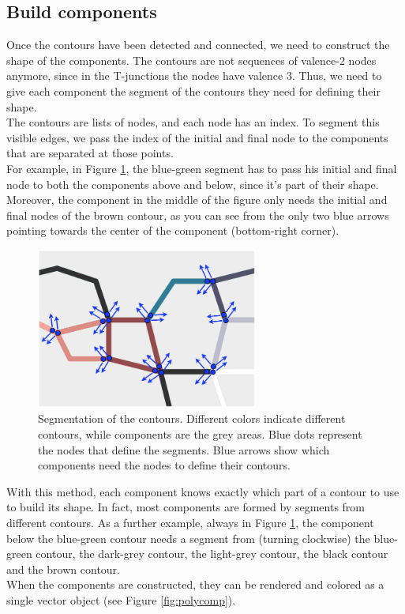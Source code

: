 \documentclass[]{usiinfbachelorproject}
\begin{document}

\subsection{Build components}

Once the contours have been detected and connected, we need to construct the shape of the components. The contours are not sequences of valence-2 nodes anymore, since in the T-junctions the nodes have valence 3. Thus, we need to give each component the segment of the contours they need for defining their shape.\\
The contours are lists of nodes, and each node has an index. To segment this visible edges, we pass the index of the initial and final node to the components that are separated at those points. \\
For example, in Figure \ref{fig:segment}, the blue-green segment has to pass his initial and final node to both the components above and below, since it's part of their shape. Moreover, the component in the middle of the figure only needs the initial and final nodes of the brown contour, as you can see from the only two blue arrows pointing towards the center of the component (bottom-right corner).

\begin{figure}[ht]
	\centering
	\includegraphics[width=0.65\textwidth]{img/segmentation.png}
	\caption{Segmentation of the contours. Different colors indicate different contours, while components are the grey areas. Blue dots represent the nodes that define the segments. Blue arrows show which components need the nodes to define their contours.}
	\label{fig:segment}
\end{figure}

\noindent With this method, each component knows exactly which part of a contour to use to build its shape. In fact, most components are formed by segments from different contours. As a further example, always in Figure \ref{fig:segment}, the component below the blue-green contour needs a segment from (turning clockwise) the blue-green contour, the dark-grey contour, the light-grey contour, the black contour and the brown contour.\\
When the components are constructed, they can be rendered and colored as a single vector object (see Figure \ref{fig:polycomp}).
\end{document}
